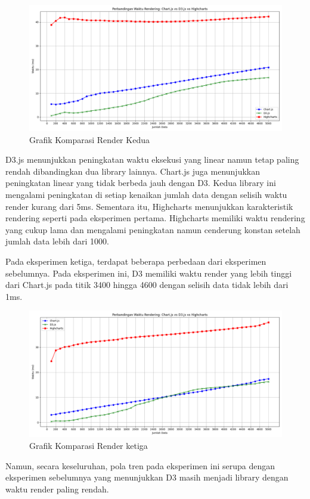 	\begin{figure}[H]
	\centering
	\includegraphics[width=0.8\linewidth]{gambar/Pembahasan/FIX_Render/Figure_2.png}
	\caption{Grafik Komparasi Render Kedua}
	\label{Grafik Komparasi Render Kedua}
\end{figure}
D3.js menunjukkan peningkatan waktu eksekusi yang linear namun tetap paling rendah dibandingkan dua library lainnya. Chart.js juga menunjukkan peningkatan linear yang tidak berbeda jauh dengan D3. Kedua library ini mengalami peningkatan di setiap kenaikan jumlah data dengan selisih waktu render kurang dari 5ms. Sementara itu, Highcharts menunjukkan karakteristik rendering seperti pada eksperimen pertama. Highcharts memiliki waktu rendering yang cukup lama dan mengalami peningkatan namun cenderung konstan setelah jumlah data lebih dari 1000.

Pada eksperimen ketiga, terdapat beberapa perbedaan dari eksperimen sebelumnya. Pada eksperimen ini, D3 memiliki waktu render yang lebih tinggi dari Chart.js pada titik 3400 hingga 4600 dengan selisih data tidak lebih dari 1ms. 
	\begin{figure}[H]
	\centering
	\includegraphics[width=0.8\linewidth]{gambar/Pembahasan/FIX_Render/Figure_3.png}
	\caption{Grafik Komparasi Render ketiga}
	\label{Grafik Komparasi Render Ketiga}
\end{figure}
Namun, secara keseluruhan, pola tren pada eksperimen ini serupa dengan eksperimen sebelumnya yang menunjukkan D3 masih menjadi library dengan waktu render paling rendah. 

